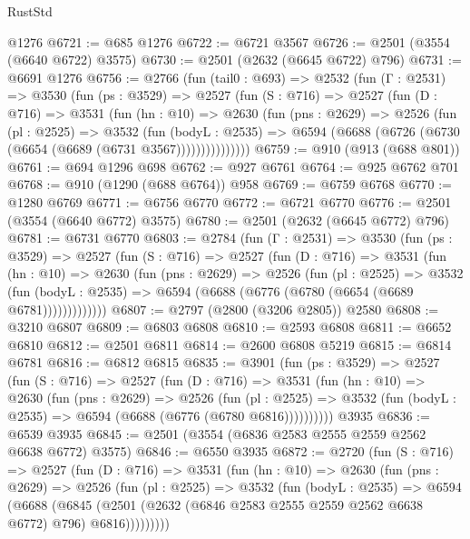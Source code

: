 \begin{lexlean}{RustStd}
\begin{coremodule}
{\begin{coremodule}
{{{{{{{{{{{{{{{{{{{{    @1276
@6721 := @685 @1276
@6722 := @6721 @3567
@6726 := @2501 (@3554 (@6640 @6722) @3575)
@6730 := @2501 (@2632 (@6645 @6722) @796)
@6731 := @6691 @1276
@6756 := @2766
    (fun (tail0 : @693) =>
    @2532
      (fun (Γ : @2531) =>
      @3530
        (fun (ps : @3529) =>
        @2527
          (fun (S : @716) =>
          @2527
            (fun (D : @716) =>
            @3531
              (fun (hn : @10) =>
              @2630
                (fun (pns : @2629) =>
                @2526
                  (fun (pl : @2525) =>
                  @3532
                    (fun (bodyL : @2535) =>
                    @6594 (@6688 (@6726 (@6730 (@6654 (@6689 (@6731 @3567)))))))))))))))
@6759 := @910 (@913 (@688 @801))
@6761 := @694 @1296 @698
@6762 := @927 @6761
@6764 := @925 @6762 @701
@6768 := @910 (@1290 (@688 @6764)) @958
@6769 := @6759 @6768
@6770 := @1280 @6769
@6771 := @6756 @6770
@6772 := @6721 @6770
@6776 := @2501 (@3554 (@6640 @6772) @3575)
@6780 := @2501 (@2632 (@6645 @6772) @796)
@6781 := @6731 @6770
@6803 := @2784
    (fun (Γ : @2531) =>
    @3530
      (fun (ps : @3529) =>
      @2527
        (fun (S : @716) =>
        @2527
          (fun (D : @716) =>
          @3531
            (fun (hn : @10) =>
            @2630
              (fun (pns : @2629) =>
              @2526
                (fun (pl : @2525) =>
                @3532
                  (fun (bodyL : @2535) =>
                  @6594 (@6688 (@6776 (@6780 (@6654 (@6689 @6781)))))))))))))
@6807 := @2797 (@2800 (@3206 @2805)) @2580
@6808 := @3210 @6807
@6809 := @6803 @6808
@6810 := @2593 @6808
@6811 := @6652 @6810
@6812 := @2501 @6811
@6814 := @2600 @6808 @5219
@6815 := @6814 @6781
@6816 := @6812 @6815
@6835 := @3901
    (fun (ps : @3529) =>
    @2527
      (fun (S : @716) =>
      @2527
        (fun (D : @716) =>
        @3531
          (fun (hn : @10) =>
          @2630
            (fun (pns : @2629) =>
            @2526
              (fun (pl : @2525) =>
              @3532 (fun (bodyL : @2535) => @6594 (@6688 (@6776 (@6780 @6816))))))))))
    @3935
@6836 := @6539 @3935
@6845 := @2501 (@3554 (@6836 @2583 @2555 @2559 @2562 @6638 @6772) @3575)
@6846 := @6550 @3935
@6872 := @2720
    (fun (S : @716) =>
    @2527
      (fun (D : @716) =>
      @3531
        (fun (hn : @10) =>
        @2630
          (fun (pns : @2629) =>
          @2526
            (fun (pl : @2525) =>
            @3532
              (fun (bodyL : @2535) =>
              @6594
                (@6688
                  (@6845
                    (@2501 (@2632 (@6846 @2583 @2555 @2559 @2562 @6638 @6772) @796) @6816)))))))))
}}}}}}}}}}}}}}}}}}}}
\end{coremodule}}
\end{coremodule}
\end{lexlean}
